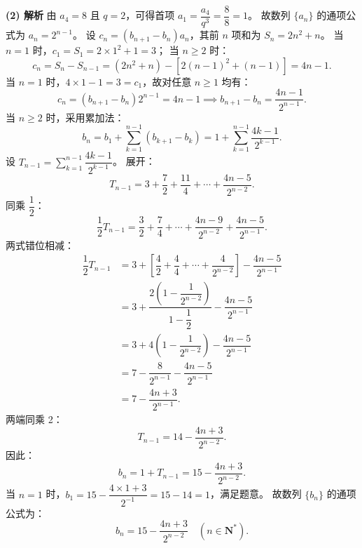 \begin{answer}
\textbf{(2) 解析} 由 $a_4 = 8$ 且 $q = 2$，可得首项 $a_1 = \dfrac{a_4}{q^3} = \dfrac{8}{8} = 1$。
故数列 $\{a_n\}$ 的通项公式为 $a_n = 2^{n-1}$。
设 $c_n = (b_{n+1} - b_n)a_n$，其前 $n$ 项和为 $S_n = 2n^2 + n$。
当 $n = 1$ 时，$c_1 = S_1 = 2 \times 1^2 + 1 = 3$；
当 $n \geqslant 2$ 时：
\nopagebreak[4]
\[c_n = S_n - S_{n-1} = (2n^2 + n) - [2(n-1)^2 + (n-1)] = 4n - 1.\]
当 $n = 1$ 时，$4 \times 1 - 1 = 3 = c_1$，故对任意 $n \geqslant 1$ 均有：
\nopagebreak[4]
\[c_n = (b_{n+1} - b_n)2^{n-1} = 4n - 1 \implies b_{n+1} - b_n = \dfrac{4n - 1}{2^{n-1}}.\]
当 $n \geqslant 2$ 时，采用累加法：
\nopagebreak[4]
\[b_n = b_1 + \sum_{k=1}^{n-1} (b_{k+1} - b_k) = 1 + \sum_{k=1}^{n-1} \dfrac{4k - 1}{2^{k-1}}.\]
设 $T_{n-1} = \sum_{k=1}^{n-1} \dfrac{4k - 1}{2^{k-1}}$。
展开：
\nopagebreak[4]
\[T_{n-1} = 3 + \dfrac{7}{2} + \dfrac{11}{4} + \cdots + \dfrac{4n - 5}{2^{n-2}}.\]
同乘 $\dfrac12$：
\nopagebreak[4]
\[\dfrac12 T_{n-1} = \dfrac{3}{2} + \dfrac{7}{4} + \cdots + \dfrac{4n - 9}{2^{n-2}} + \dfrac{4n - 5}{2^{n-1}}.\]
两式错位相减：
\nopagebreak[4]
\[\begin{aligned}
\dfrac12 T_{n-1} &= 3 + \left[\dfrac{4}{2} + \dfrac{4}{4} + \cdots + \dfrac{4}{2^{n-2}}\right] - \dfrac{4n - 5}{2^{n-1}} \\
&= 3 + \dfrac{2\left(1 - \dfrac{1}{2^{n-2}}\right)}{1 - \dfrac12} - \dfrac{4n - 5}{2^{n-1}} \\
&= 3 + 4\left(1 - \dfrac{1}{2^{n-2}}\right) - \dfrac{4n - 5}{2^{n-1}} \\
&= 7 - \dfrac{8}{2^{n-1}} - \dfrac{4n - 5}{2^{n-1}} \\
&= 7 - \dfrac{4n + 3}{2^{n-1}}.
\end{aligned}\]
两端同乘 2：
\nopagebreak[4]
\[T_{n-1} = 14 - \dfrac{4n + 3}{2^{n-2}}.\]
因此：
\nopagebreak[4]
\[b_n = 1 + T_{n-1} = 15 - \dfrac{4n + 3}{2^{n-2}}.\]
当 $n = 1$ 时，$b_1 = 15 - \dfrac{4 \times 1 + 3}{2^{-1}} = 15 - 14 = 1$，满足题意。
故数列 $\{b_n\}$ 的通项公式为：
\nopagebreak[4]
\[b_n = 15 - \dfrac{4n + 3}{2^{n-2}}\quad (n \in \mathbf N^*).\]



\end{answer}
